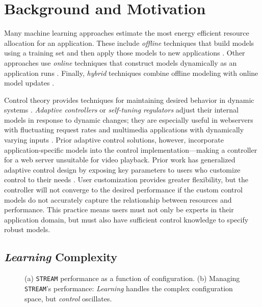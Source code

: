 \section{Background and Motivation}
\label{sec:example}
Many machine learning approaches estimate the most energy efficient
resource allocation for an application.  These include \emph{offline}
techniques that build models using a training set and then apply those
models to new applications
\cite{Yi2003,LeeBrooks2006,CPR,ChenJohn2011,reddiHPCA2013,Paragon,PUPiL,quasar}.
Other approaches use \emph{online} techniques that construct models
dynamically as an application runs
\cite{Li2006,Flicker,ParallelismDial,Ponamarev,LeeBrooks}.  Finally,
\emph{hybrid} techniques combine offline modeling with online model
updates \cite{Zhang2012,packandcap,Winter2010,dubach2010,Koala,Cinder,
  wu2012inferred,LEO}.

Control theory provides techniques for maintaining desired behavior in
dynamic systems \cite{Hellerstein2004a}. \emph{Adaptive controllers}
or \emph{self-tuning regulators} adjust their internal models in
response to dynamic changes; they are especially useful in webservers
with fluctuating request rates
\cite{Horvarth,LuEtAl-2006a,SunDaiPan-2008a} and multimedia
applications with dynamically varying inputs
\cite{TCST,Agilos,grace2}.  Prior adaptive control solutions, however,
incorporate application-specific models into the control
implementation---making a controller for a web server unsuitable for
video playback.  Prior work has generalized adaptive control design by
exposing key parameters to users who customize control to their needs
\cite{ControlWare,POET}.  User customization provides greater
flexibility, but the controller will not converge to the desired
performance if the custom control models do not accurately capture the
relationship between resources and performance.  This practice means
users must not only be experts in their application domain, but must
also have sufficient control knowledge to specify robust models.


\subsection{\emph{Learning} Complexity}
\begin{figure}
\centering
  \subfloat[]
  {
    
    \label{fig:STREAM_timeline}
  }
  \caption{(a) \texttt{STREAM} performance as a function of
    configuration.  (b) Managing \texttt{STREAM}'s performance:
    \emph{Learning} handles the complex configuration space, but
    \emph{control} oscillates.}
  \label{fig:learning-models1}
\end{figure}

